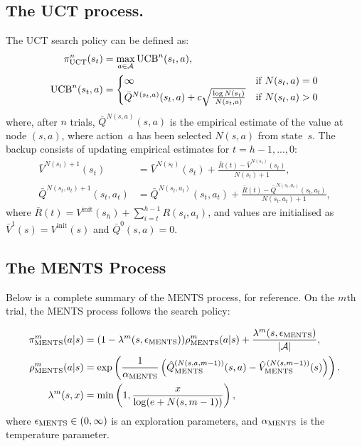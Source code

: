     \subsection{The UCT process.} 
    	The UCT search policy can be defined as:
        \begin{align}
            \pi_{\textnormal{UCT}}^n(s_t) &= \max_{a\in\mathcal{A}} \text{UCB}^n(s_t,a), \\
            \text{UCB}^n(s_t, a) &= 
                    \begin{cases}
                        \infty & \text{if } N(s_t,a)=0 \\
                        \bar{Q}^{N(s_t,a)}(s_t, a)+c \sqrt{\frac{\log N(s_t)}{N(s_t, a)}} & \text{if } N(s_t,a)>0
                    \end{cases}
        \end{align}
        \noindent where, after $n$ trials, $\bar{Q}^{N(s,a)}(s,a)$ is the empirical estimate of the value at node $(s,a)$, where action~$a$ has been selected $N(s, a)$ from state~$s$. The backup consists of updating empirical estimates for $t=h-1,...,0$:
        \begin{align}
            \bar{V}^{N(s_t)+1}(s_t) &= \bar{V}^{N(s_t)}(s_t) + \frac{\bar{R}(t) - \bar{V}^{N(s_t)}(s_t)}{N(s_t) + 1}, \label{appeq:uct_vbar} \\
            \bar{Q}^{N(s_t,a_t)+1}(s_t, a_t) &= \bar{Q}^{N(s_t,a_t)}(s_t, a_t) + \frac{\bar{R}(t) - \bar{Q}^{N(s_t,a_t)}(s_t, a_t)}{N(s_t, a_t) + 1}, \label{appeq:uct_qbar}
        \end{align}
        \noindent where $\bar{R}(t) = V^{\text{init}}(s_h) + \sum_{i=t}^{h-1} R(s_i,a_i)$, and values are initialised as $\bar{V}^1(s)=V^{\text{init}}(s)$ and $\bar{Q}^0(s,a)=0$. 
    

    
    
    
    \subsection{The MENTS Process}
    
        Below is a complete summary of the MENTS process, for reference. On the $m$th trial, the MENTS process follows the search policy:


        \begin{align}
            {\pi^{m}_{{\textnormal{MENTS}}}}(a|s) &= (1-{\lambda^{m}(s,{\epsilon_{{\textnormal{MENTS}}}})}){\rho^{m}_{{\textnormal{MENTS}}}}(a|s) + \frac{{\lambda^{m}(s,{\epsilon_{{\textnormal{MENTS}}}})}}{|\mathcal{A}|}, 
                        \label{appeq:ments_soft_policy} \\ 
            {\rho^{m}_{{\textnormal{MENTS}}}}(a|s) &= \exp\left(
                \frac{1}{{\alpha_{{\textnormal{MENTS}}}}}\left({\hat{Q}^{(N(s,a,m-1))}_{{\textnormal{MENTS}}}}(s,a)-{\hat{V}^{(N(s,m-1))}_{{\textnormal{MENTS}}}}(s)\right)\right). \\
            \lambda^m(s,x) &= \min\left(1, \frac{x}{\log(e+N(s,m-1))}\right),
        \end{align}
        where ${\epsilon_{{\textnormal{MENTS}}}}\in(0,\infty)$ is an exploration parameters, and ${\alpha_{{\textnormal{MENTS}}}}$ is the temperature parameter. 

